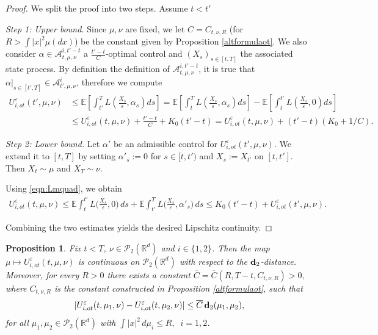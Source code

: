 \documentclass[reqno,11pt]{amsart}
\newtheorem{proposition}[theorem]{Proposition}
\numberwithin{equation}{section}
\newcommand{\zd}[1]{{\color{brown}[ZD:#1]}}
\newcommand{\e}{\varepsilon}
\newcommand{\nd}{\noindent}
\begin{document}
\begin{proof}
We split the proof into two steps. Assume $t<t'$

\medskip
\noindent\emph{Step 1: Upper bound.} Since $\mu,\nu$ are fixed, we let $C=C_{t,\nu,R}$ (for $R>\int |x|^2\mu(dx)$) be the constant given by Proposition \ref{altformulaot}.
We also consider $\alpha\in \mathcal{A}_{t,\mu,\nu}^{i,t'-t}$ a $\frac{t'-t}{C}$-optimal control and $(X_s)_{s\in [t,T]}$ the associated state process. By definition the definition of $\mathcal{A}_{t,\mu,\nu}^{i,t'-t}$, it is true that $\alpha|_{s\in [t',T]}\in \mathcal{A}_{t',\mu,\nu}^i$, therefore we compute
\begin{align*}
    U_{i,ot}^\e(t',\mu,\nu)&\le\mathbb{E}\left[\int_{t'}^TL\left(\frac{X_s}{\e},\alpha_s\right) ds \right]=\mathbb{E}\left[\int_{t}^TL\left(\frac{X_s}{\e},\alpha_s\right) ds \right]-\mathbb{E}\left[\int_{t}^{t'}L\left(\frac{X_s}{\e},0\right) ds \right]\\
    &\le U_{i,ot}^\e(t,\mu,\nu)+\frac{t'-t}{C}+K_0(t'-t)=U_{i,ot}^\e(t,\mu,\nu)+ (t'-t)(K_0+1/C).
\end{align*}


\medskip
\noindent\emph{Step 2: Lower bound.}
Let $\alpha'$ be an admissible control for $U_{i,ot}^\varepsilon(t',\mu,\nu)$.
We extend it to $[t,T]$ by setting $\alpha'_s:=0$ for $s\in[t,t')$ and
$X_s:=X_{t'}$ on $[t,t']$.
Then $X_t\sim\mu$ and $X_T\sim\nu$.
\vspace{1mm}

\nd
Using \eqref{eqn:Lmquad}, we obtain
\begin{align*}
U_{i,ot}^\varepsilon(t,\mu,\nu)\le
\mathbb E\int_t^{t'} L\Big(\frac{X_s}{\varepsilon},0\Big)\,ds
+
\mathbb E\int_{t'}^T L\Big(\frac{X_s}{\varepsilon},\alpha'_s\Big)\,ds \le
K_0(t'-t)+U_{i,ot}^\varepsilon(t',\mu,\nu).
\end{align*}

\medskip

\nd
Combining the two estimates yields the desired Lipschitz continuity.
\end{proof}


\begin{proposition}\label{measure lip}
Fix $t<T$, $\nu\in\mathcal P_2(\mathbb R^d)$ and $i\in \{1,2\}$. Then the map $\mu\mapsto U_{i,ot}^\varepsilon(t,\mu,\nu)$ is continuous on $\mathcal P_2(\mathbb R^d)$ with respect to the ${\bf d}_2$-distance.
Moreover, for every $R>0$ there exists a constant $\overline{C}=\overline{C}(R,T-t,C_{t,\nu,R})>0,$ where $C_{t,\nu,R}$ is the constant constructed in Proposition \ref{altformulaot}, such that
\[
|U_{i,ot}^\varepsilon(t,\mu_1,\nu)-U_{i,ot}^\varepsilon(t,\mu_2,\nu)|
\le \overline{C}\,{\bf d}_2(\mu_1,\mu_2),
\]
for all $\mu_1,\mu_2\in\mathcal P_2(\mathbb R^d)$
with $\int|x|^2\,d\mu_i\le R,\;\; i=1,2$.
\end{proposition}
\end{document}
